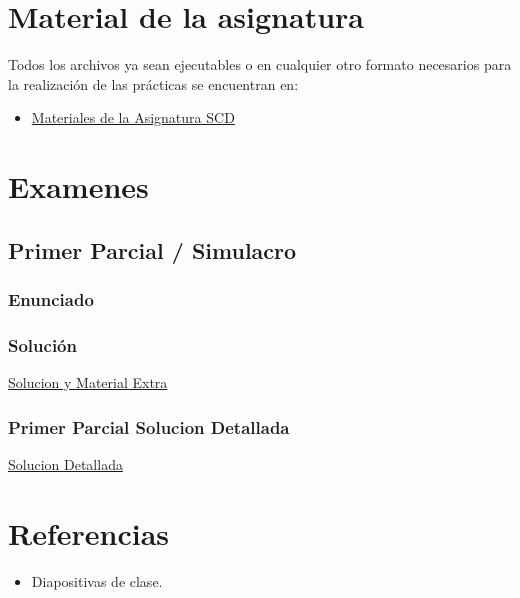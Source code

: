 \documentclass[a4paper,12pt]{article}
\begin{document}
\newpage
\section{Material de la asignatura}
Todos los archivos ya sean ejecutables o en cualquier otro formato necesarios para la realización de las prácticas se encuentran en:

\begin{itemize}
    \item \href{https://github.com/ElblogdeIsmael/ElblogdeIsmael.github.io/tree/main/Subjects/Third/SCD}{Materiales de la Asignatura SCD}

\end{itemize}

\section{Examenes}

\subsection{Primer Parcial / Simulacro}
\subsubsection{Enunciado}

\subsubsection{Solución}
\href{https://github.com/ElblogdeIsmael/ElblogdeIsmael.github.io/tree/main/Subjects/Third/SCD/Examenes}{Solucion y Material Extra}

\subsubsection{Primer Parcial Solucion Detallada}
\href{https://github.com/ElblogdeIsmael/ElblogdeIsmael.github.io/tree/main/Subjects/Third/SCD/Examenes/Parcial_SCD_Extra/ETSIIT/build/Parcial.pdf}{Solucion Detallada}



\section{Referencias}
\begin{itemize}
    \item Diapositivas de clase.
\end{itemize}
\end{document}
